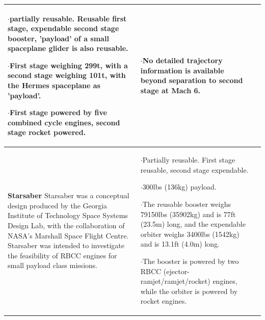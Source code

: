 {\begin{landscape}
\begin{xltabular}{\linewidth}{|X|X|X|}
$\cdot$partially reusable. Reusable first stage, expendable second stage booster, 'payload' of a small spaceplane glider is also reusable. 

$\cdot$First stage weighing 299t, with a second stage weighing 101t, with the Hermes spaceplane as 'payload'. 

$\cdot$First stage powered by five combined cycle engines, second stage rocket powered. 
	
	&\small
	$\cdot$No detailed trajectory information is available beyond separation to second stage at Mach 6. 
	
	\\
	\hline \small 
	\textbf{Starsaber}\cite{Germain2001}\newline\newline
	Starsaber was a conceptual design produced by the Georgia Institute of Technology Space Systems Design Lab, with the collaboration of NASA's Marshall Space Flight Centre. Starsaber was intended to investigate the feasibility of RBCC engines for small payload class missions. 
	&\small
	
	$\cdot$Partially reusable. First stage reusable, second stage expendable. 
	
	$\cdot$300lbs (136kg) payload. 
	
	$\cdot$The reusable booster weighs 79150lbs (35902kg) and is 77ft (23.5m) long, and the expendable orbiter weighs 3400lbs (1542kg) and is 13.1ft (4.0m) long. 
	
	$\cdot$The booster is powered by two RBCC (ejector-ramjet/ramjet/rocket) engines, while the orbiter is powered by rocket engines.  
	

\end{xltabular}
\end{landscape}}
